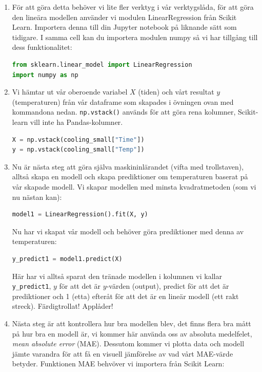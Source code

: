 \documentclass{article}
\begin{document}
\begin{enumerate}
    \item För att göra detta behöver vi lite fler verktyg i vår verktygslåda, för att göra den lineära modellen använder vi modulen LinearRegression från Scikit Learn. Importera denna till din Jupyter notebook på liknande sätt som tidigare. I samma cell kan du importera modulen numpy så vi har tillgång till dess funktionalitet:
    \begin{lstlisting}[language=Python]
from sklearn.linear_model import LinearRegression
import numpy as np
\end{lstlisting}
    \item Vi hämtar ut vår oberoende variabel $X$ (tiden) och vårt resultat $y$ (temperaturen) från vår dataframe som skapades i övningen ovan med kommandona nedan. \texttt{np.vstack()} används för att göra rena kolumner, Scikit-learn vill inte ha Pandas-kolumner.
    \begin{lstlisting}[language=Python]
X = np.vstack(cooling_small["Time"])
y = np.vstack(cooling_small["Temp"])
\end{lstlisting}
    \item Nu är nästa steg att göra själva maskininlärandet (vifta med trollstaven), alltså skapa en modell och skapa prediktioner om temperaturen baserat på vår skapade modell. Vi skapar modellen med minsta kvadratmetoden (som vi nu nästan kan):
    \begin{lstlisting}[language=Python]
model1 = LinearRegression().fit(X, y)
\end{lstlisting}
    Nu har vi skapat vår modell och behöver göra prediktioner med denna av temperaturen:
    \begin{lstlisting}[language=Python]
y_predict1 = model1.predict(X)
\end{lstlisting}
    Här har vi alltså sparat den tränade modellen i kolumnen vi kallar \texttt{y\_predict1}, $y$ för att det är $y$-värden (output), predict för att det är prediktioner och 1 (etta) efteråt för att det är en lineär modell (ett rakt streck). Färdigtrollat! Applåder!
    \item Nästa steg är att kontrollera hur bra modellen blev, det finns flera bra mått på hur bra en modell är, vi kommer här använda oss av absoluta medelfelet, \emph{mean absolute error} (MAE). Dessutom kommer vi plotta data och modell jämte varandra för att få en visuell jämförelse av vad vårt MAE-värde betyder. Funktionen MAE behvöver vi importera från Scikit Learn:
    \begin{lstlisting}[language=Python]

\end{lstlisting}
\end{enumerate}
\end{document}
